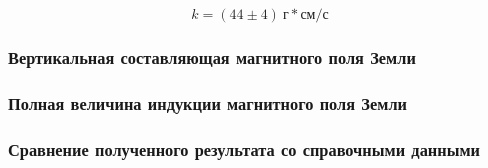 \documentclass[a4paper, 12pt]{article}
\begin{document}
                $$
                    k = (44 \pm 4)~г*см/с
                $$

            \subsubsection{Вертикальная составляющая магнитного поля Земли}

            \subsubsection{Полная величина индукции магнитного поля Земли}

            \subsubsection{Сравнение полученного результата со справочными данными}
\end{document}

